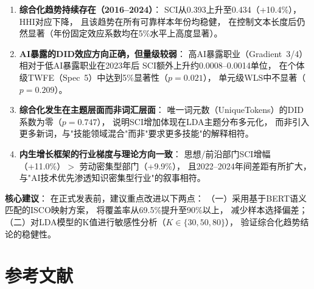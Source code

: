 \documentclass[12pt,a4paper]{ctexart}
\begin{document}
\begin{enumerate}[label=\textbf{C\arabic*.}]
    \item \textbf{综合化趋势持续存在（2016--2024）}：
    SCI从0.393上升至0.434（+10.4\%），HHI对应下降，
    且该趋势在所有可靠样本年份均稳健，
    在控制文本长度后仍然显著（年份固定效应系数均在5\%水平上高度显著）。

    \item \textbf{AI暴露的DID效应方向正确，但量级较弱}：
    高AI暴露职业（Gradient~3/4）相对于低AI暴露职业在2023年后
    SCI额外上升约0.0008--0.0014单位，
    在个体级TWFE（Spec~5）中达到5\%显著性（$p = 0.021$），
    单元级WLS中不显著（$p = 0.209$）。

    \item \textbf{综合化发生在主题层面而非词汇层面}：
    唯一词元数（UniqueTokens）的DID系数为零（$p = 0.747$），
    说明SCI增加体现在LDA主题分布多元化，
    而非引入更多新词，与"技能领域混合"而非"要求更多技能"的解释相符。

    \item \textbf{内生增长框架的行业梯度与理论方向一致}：
    思想/前沿部门SCI增幅（+11.0\%）$>$ 劳动密集型部门（+9.9\%），
    且2022--2024年间差距有所扩大，
    与"AI技术优先渗透知识密集型行业"的叙事相符。
\end{enumerate}

\textbf{核心建议}：
在正式发表前，建议重点改进以下两点：
（一）采用基于BERT语义匹配的ISCO映射方案，
将覆盖率从69.5\%提升至90\%以上，
减少样本选择偏差；
（二）对LDA模型的K值进行敏感性分析（$K \in \{30, 50, 80\}$），
验证综合化趋势结论的稳健性。

\section*{参考文献}
\end{document}
